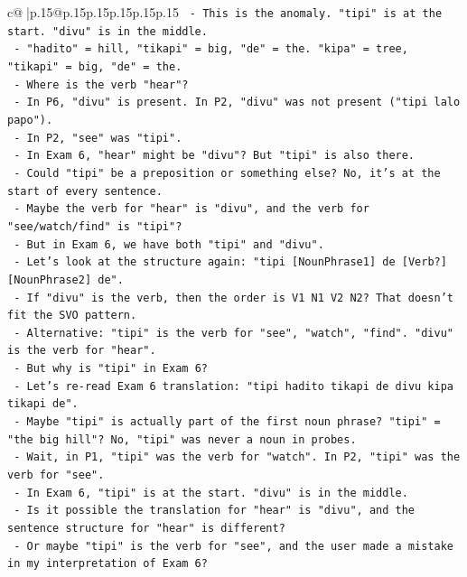 \documentclass{article}
\begin{document}
{\begin{supertabular}{c@{$\;$}|p{.15\linewidth}@{}p{.15\linewidth}p{.15\linewidth}p{.15\linewidth}p{.15\linewidth}p{.15\linewidth}}
{{{\texttt{              {-} This is the anomaly. "tipi" is at the start. "divu" is in the middle.} \\
\texttt{              {-} "hadito" = hill, "tikapi" = big, "de" = the. "kipa" = tree, "tikapi" = big, "de" = the.} \\
\texttt{              {-} Where is the verb "hear"?} \\
\texttt{              {-} In P6, "divu" is present. In P2, "divu" was not present ("tipi lalo papo").} \\
\texttt{              {-} In P2, "see" was "tipi".} \\
\texttt{              {-} In Exam 6, "hear" might be "divu"? But "tipi" is also there.} \\
\texttt{              {-} Could "tipi" be a preposition or something else? No, it's at the start of every sentence.} \\
\texttt{              {-} Maybe the verb for "hear" is "divu", and the verb for "see/watch/find" is "tipi"?} \\
\texttt{              {-} But in Exam 6, we have both "tipi" and "divu".} \\
\texttt{              {-} Let's look at the structure again: "tipi {[}NounPhrase1{]} de {[}Verb?{]} {[}NounPhrase2{]} de".} \\
\texttt{              {-} If "divu" is the verb, then the order is V1 N1 V2 N2? That doesn't fit the SVO pattern.} \\
\texttt{              {-} Alternative: "tipi" is the verb for "see", "watch", "find". "divu" is the verb for "hear".} \\
\texttt{              {-} But why is "tipi" in Exam 6?} \\
\texttt{              {-} Let's re{-}read Exam 6 translation: "tipi hadito tikapi de divu kipa tikapi de".} \\
\texttt{              {-} Maybe "tipi" is actually part of the first noun phrase? "tipi" = "the big hill"? No, "tipi" was never a noun in probes.} \\
\texttt{              {-} Wait, in P1, "tipi" was the verb for "watch". In P2, "tipi" was the verb for "see".} \\
\texttt{              {-} In Exam 6, "tipi" is at the start. "divu" is in the middle.} \\
\texttt{              {-} Is it possible the translation for "hear" is "divu", and the sentence structure for "hear" is different?} \\
\texttt{              {-} Or maybe "tipi" is the verb for "see", and the user made a mistake in my interpretation of Exam 6?} \\
}}}
\end{supertabular}}
\end{document}
